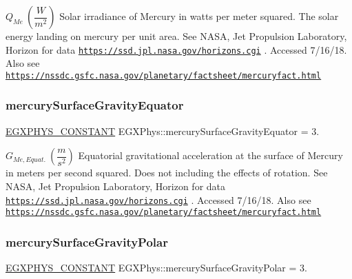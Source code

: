 $ Q_{Me} \ (\dfrac{W}{m^2})$ Solar irradiance of Mercury in watts per meter squared. The solar energy landing on mercury per unit area. See N\+A\+SA, Jet Propulsion Laboratory, Horizon for data \href{https://ssd.jpl.nasa.gov/horizons.cgi}{\tt https\+://ssd.\+jpl.\+nasa.\+gov/horizons.\+cgi} . Accessed 7/16/18. Also see \href{https://nssdc.gsfc.nasa.gov/planetary/factsheet/mercuryfact.html}{\tt https\+://nssdc.\+gsfc.\+nasa.\+gov/planetary/factsheet/mercuryfact.\+html} \mbox{\label{group___e_g_x_phys-_constants-_astrophysics-_solar_system-_mercury-_bulk_ga82c6a427ba4ba310574c522cff333693}} 
\subsubsection{\texorpdfstring{mercury\+Surface\+Gravity\+Equator}{mercurySurfaceGravityEquator}}
{\footnotesize\ttfamily \mbox{\hyperlink{group___e_g_x_phys-_constants-_macros_ga76980d288494ce1714c9ac68a95ba702}{E\+G\+X\+P\+H\+Y\+S\+\_\+\+C\+O\+N\+S\+T\+A\+NT}} E\+G\+X\+Phys\+::mercury\+Surface\+Gravity\+Equator = 3.}

$ G_{Me,Equat.} \ (\dfrac{m}{s^2})$ Equatorial gravitational acceleration at the surface of Mercury in meters per second squared. Does not including the effects of rotation. See N\+A\+SA, Jet Propulsion Laboratory, Horizon for data \href{https://ssd.jpl.nasa.gov/horizons.cgi}{\tt https\+://ssd.\+jpl.\+nasa.\+gov/horizons.\+cgi} . Accessed 7/16/18. Also see \href{https://nssdc.gsfc.nasa.gov/planetary/factsheet/mercuryfact.html}{\tt https\+://nssdc.\+gsfc.\+nasa.\+gov/planetary/factsheet/mercuryfact.\+html} \mbox{\label{group___e_g_x_phys-_constants-_astrophysics-_solar_system-_mercury-_bulk_ga7fdbe2d882ff39cc6151ed1c9afb93f7}} 
\subsubsection{\texorpdfstring{mercury\+Surface\+Gravity\+Polar}{mercurySurfaceGravityPolar}}
{\footnotesize\ttfamily \mbox{\hyperlink{group___e_g_x_phys-_constants-_macros_ga76980d288494ce1714c9ac68a95ba702}{E\+G\+X\+P\+H\+Y\+S\+\_\+\+C\+O\+N\+S\+T\+A\+NT}} E\+G\+X\+Phys\+::mercury\+Surface\+Gravity\+Polar = 3.}

